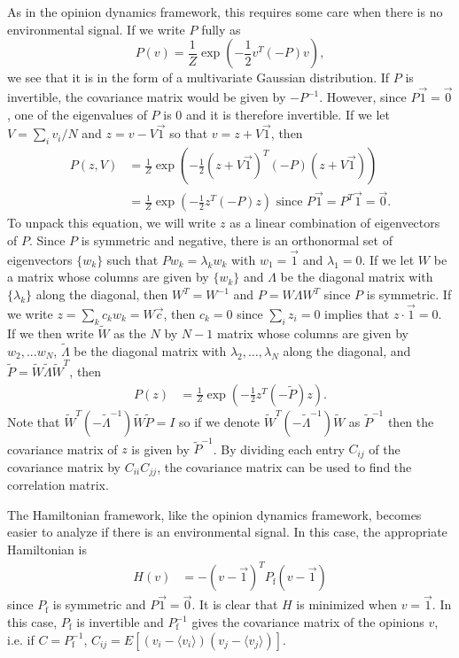 \documentclass{article}
\begin{document}
As in the opinion dynamics framework, this requires some care when there is no environmental signal. If we write $P$ fully as 
\begin{equation}
P(v)=\frac{1}{Z}\exp\left(-\frac{1}{2}v^T(-P)v\right),
\end{equation}
we see that it is in the form of a multivariate Gaussian distribution. If $P$ is invertible, the covariance matrix would be given by $-P^{-1}$. However, since $P\vec{1}=\vec{0}$, one of the eigenvalues of $P$ is $0$ and it is therefore invertible. If we let $V=\sum_iv_i/N$ and $z=v-V\vec{1}$ so that $v=z+V\vec{1}$, then 
\begin{align*}
P(z,V)&=\frac{1}{Z}\exp\left(-\frac{1}{2}(z+V\vec{1})^T(-P)(z+V\vec{1})\right)
\\&=\frac{1}{Z}\exp\left(-\frac{1}{2}z^T(-P)z\right) \text{ since }P\vec{1}=P^T\vec{1}=\vec{0}.
\end{align*}
To unpack this equation, we will write $z$ as a linear combination of eigenvectors of $P$. Since $P$ is symmetric and negative, there is an orthonormal set of eigenvectors $\{w_k\}$ such that $Pw_k=\lambda_kw_k$ with $w_1=\vec{1}$ and $\lambda_1=0$. If we let $W$ be a matrix whose columns are given by $\{w_k\}$ and $\Lambda$ be the diagonal matrix with $\{\lambda_k\}$ along the diagonal, then $W^T=W^{-1}$ and $P=W\Lambda W^T$ since $P$ is symmetric. If we write $z=\sum_kc_kw_k=W\vec{c}$, then $c_k=0$ since $\sum_iz_i=0$ implies that $z\cdot \vec{1}=0$. If we then write $\tilde{W}$ as the $N$ by $N-1$ matrix whose columns are given by $w_2,...w_N$,  $\tilde{\Lambda}$ be the diagonal matrix with $\lambda_2,\dots,\lambda_N$ along the diagonal, and $\tilde{P}=\tilde{W}\tilde{\Lambda}\tilde{W}^T$, then 
\begin{align*}
P(z)&=\frac{1}{Z}\exp\left(-\frac{1}{2}z^T(-\tilde{P})z\right).
\end{align*}
Note that $\tilde{W}^T(-\tilde{\Lambda}^{-1})\tilde{W}\tilde{P}=I$ so if we denote $\tilde{W}^T(-\tilde{\Lambda}^{-1})\tilde{W}$ as $\tilde{P}^{-1}$ then the covariance matrix of $z$ is given by $\tilde{P}^{-1}$. By dividing each entry $C_{ij}$ of the covariance matrix by $C_{ii}C_{jj}$, the covariance matrix can be used to find the correlation matrix.

The Hamiltonian framework, like the opinion dynamics framework, becomes easier to analyze if there is an environmental signal. In this case, the appropriate Hamiltonian is 
\begin{equation}
\begin{array}{lll}
H(v)&=-(v-\vec{1})^TP_\text{f}(v-\vec{1})
\end{array}
\end{equation}
since $P_\text{f}$ is symmetric and $P\vec{1}=\vec{0}$. It is clear that $H$ is minimized when $v=\vec{1}$.  In this case, $P_\text{f}$ is invertible and $P_\text{f}^{-1}$ gives the covariance matrix of the opinions $v$, i.e. if $C=P_\text{f}^{-1}$, $C_{ij}=E[(v_i-\langle v_i\rangle)(v_j-\langle v_j\rangle)]$.
\end{document}
